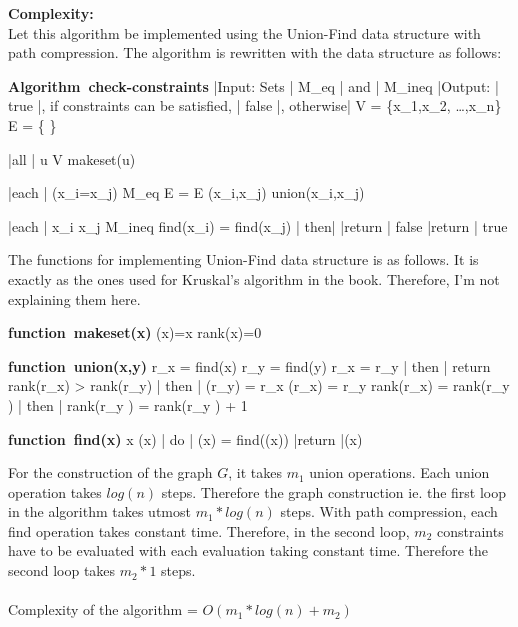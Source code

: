 \documentclass{article}
\begin{document}
\noindent \textbf{Complexity:}\\
Let this algorithm be implemented using the Union-Find data structure with path compression. The algorithm is rewritten with the data structure as follows:

\NumberProgramstrue
\begin{program}
\mbox{\textbf{Algorithm check-constraints}}
|Input: Sets | M_{eq} | and | M_{ineq}
|Output: | true |, if constraints can be satisfied, | false |, otherwise|
\BEGIN
	V = \{x_{1},x_{2}, \ldots,x_{n}\}
	E = \{ \}

	\FOR |all | u \in V \DO
		makeset(u)
	\OD
	
	\FOR |each | (x_{i}=x_{j}) \in  M_{eq} \DO
		E = E \union (x_{i},x_{j})
		union(x_{i},x_{j})
	\OD

	\FOR |each | x_{i} \neq x_{j} \in M_{ineq} \DO
		\IF find(x_{i}) = find(x_{j}) | then|
			|return | false 
		\FI
	\OD
	|return | true 
\END
\end{program}

The functions for implementing Union-Find data structure is as follows. It is exactly as the ones used for Kruskal's algorithm in the book. Therefore, I'm not explaining them here.

\begin{program}
\mbox{\textbf{function makeset(x)}}
\BEGIN
\pi(x)=x
rank(x)=0
\END
\end{program}

\begin{program}
\mbox{\textbf{function union(x,y)}}
\BEGIN
r_{x} = find(x)
r_{y} = find(y)
\IF r_{x} = r_{y} | then |
	return
\FI
\IF rank(r_{x}) > rank(r_{y}) | then |
	\pi(r_{y}) = r_{x}
\ELSE
	\pi(r_{x}) = r_{y}
	\IF rank(r_{x}) = rank(r_{y} ) | then |
		rank(r_{y} ) = rank(r_{y} ) + 1
	\FI
\FI
\END
\end{program}

\begin{program}
\mbox{\textbf{function find(x)}}
\BEGIN
	\WHILE x \neq \pi(x) | do |
		\pi(x) = find(\pi(x))
	\END
|return |\pi(x)
\END
\end{program}

For the construction of the graph $G$, it takes $m_{1}$ union operations. Each union operation takes $log(n)$ steps. Therefore the graph construction ie. the first loop in the algorithm takes utmost $m_{1}*log(n)$ steps. With path compression, each find operation takes constant time. Therefore, in the second loop, $m_{2}$ constraints have to be evaluated with each evaluation taking constant time. Therefore the second loop takes $m_{2}*1$ steps.
\ \\ \\
 Complexity of the algorithm = $O(m_{1}*log(n) + m_{2})$
\end{document}
